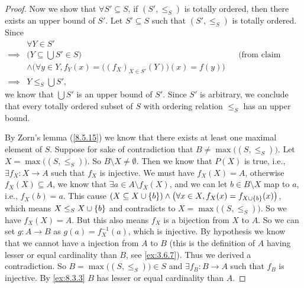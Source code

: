 \begin{proof}
  Now we show that \(\forall S' \subseteq S\), if \((S', \leq_S)\) is totally ordered, then there exists an upper bound of \(S'\).
  Let \(S' \subseteq S\) such that \((S', \leq_S)\) is totally ordered.
  Since
  \begin{align*}
             & \forall Y \in S'                                                                                                 \\
    \implies & \Big(Y \subseteq \bigcup S' \in S\Big)                                            &  & \text{(from claim above)} \\
             & \land \Big(\forall y \in Y, f_Y(x) = \big((f_X)_{X \in S'}(Y)\big)(x) = f(y)\Big)                                \\
    \implies & Y \leq_S \bigcup S',
  \end{align*}
  we know that \(\bigcup S'\) is an upper bound of \(S'\).
  Since \(S'\) is arbitrary, we conclude that every totally ordered subset of \(S\) with ordering relation \(\leq_S\) has an upper bound.

  By Zorn's lemma (\cref{8.5.15}) we know that there exists at least one maximal element of \(S\).
  Suppose for sake of contradiction that \(B \neq \max\big((S, \leq_S)\big)\).
  Let \(X = \max\big((S, \leq_S)\big)\).
  So \(B \setminus X \neq \emptyset\).
  Then we know that \(P(X)\) is true, i.e., \(\exists f_X : X \to A\) such that \(f_X\) is injective.
  We must have \(f_X(X) = A\), otherwise \(f_X(X) \subseteq A\), we know that \(\exists a \in A \setminus f_X(X)\), and we can let \(b \in B \setminus X\) map to \(a\), i.e., \(f_X(b) = a\).
  This cause \((X \subseteq X \cup \left\lbrace b\right\rbrace) \land \big(\forall x \in X, f_X(x) = f_{X \cup \left\lbrace b\right\rbrace}(x)\big)\), which means \(X \leq_S X \cup \left\lbrace b\right\rbrace\) and contradicts to \(X = \max\big((S, \leq_S)\big)\).
  So we have \(f_X(X) = A\).
  But this also means \(f_X\) is a bijection from \(X\) to \(A\).
  So we can set \(g : A \to B\) as \(g(a) = f_X^{-1}(a)\), which is injective.
  By hypothesis we know that we cannot have a injection from \(A\) to \(B\) (this is the definition of \(A\) having lesser or equal cardinality than \(B\), see \cref{ex:3.6.7}).
  Thus we derived a contradiction.
  So \(B = \max\big((S, \leq_S)\big) \in S\) and \(\exists f_B : B \to A\) such that \(f_B\) is injective.
  By \cref{ex:8.3.3} \(B\) has lesser or equal cardinality than \(A\).
\end{proof}

